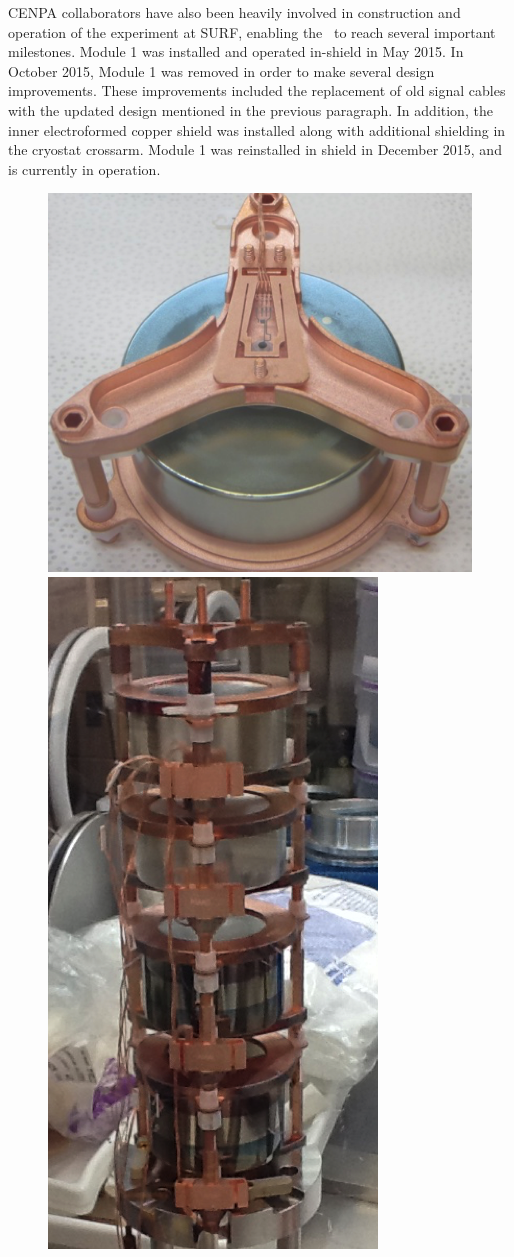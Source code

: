 CENPA collaborators have also been heavily involved in construction and operation of the experiment at SURF, enabling the \MJ~\MJDemo to reach several important milestones. Module 1 was installed and operated in-shield in May 2015. In October 2015, Module 1 was removed in order to make several design improvements. These improvements included the replacement of old signal cables with the updated design mentioned in the previous paragraph. In addition, the inner electroformed copper shield was installed along with additional shielding in the cryostat crossarm. Module 1 was reinstalled in shield in December 2015, and is currently in operation.
  
\begin{figure}[h]
\hfil  \includegraphics[width=.60\textwidth]{MJD_detectorUnit.png} \hfil 
\hfil  \includegraphics[width=.30\textwidth]{MJD_string.png} \hfil

~


\label{MJD_Assemblies}  %

\end{figure}


